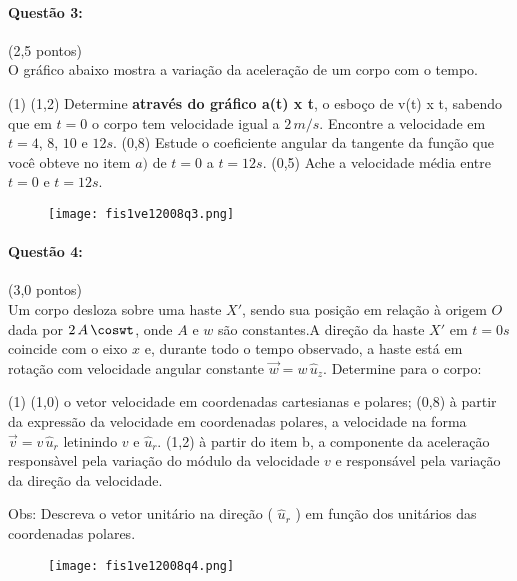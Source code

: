 \documentclass[12pt,a4paper]{article}
\begin{document}
\paragraph{Questão 3:}(2,5 pontos)\\
O gráfico abaixo mostra a variação da aceleração de um corpo com o tempo.

\begin {tasks}(1)
\task (1,2) Determine \textbf{através do gráfico a(t) x t}, o esboço de v(t) x t, sabendo que em $t=0$ o corpo tem velocidade igual a $2\,m/s$. Encontre a velocidade em $t=4$, $8$, $10$ e $12s$.
\task (0,8) Estude o coeficiente angular da tangente da função que você obteve no item $a)$ de $t=0$ a $t=12s$.
\task (0,5) Ache a velocidade média entre $t=0$ e $t=12s$.
\end {tasks}

\begin{figure}[ht]
\centering
\texttt{[image: fis1ve12008q3.png]}
\end{figure}

\newpage
\paragraph{Questão 4:}(3,0 pontos)\\
Um corpo desloza sobre uma haste $X'$, sendo sua posição em relação à origem $O$ dada por $2\,A\,\coswt$, onde $A$ e $w$ são constantes.A direção da haste $X'$ em $t=0s$ coincide com o eixo $x$ e, durante todo o tempo observado, a haste está em rotação com velocidade angular constante $\vec{w}=w\,\hat{u}_z$. Determine para o corpo: 

\begin{tasks}(1)
\task (1,0) o vetor velocidade em coordenadas cartesianas e polares;
\task (0,8) à partir da expressão da velocidade em coordenadas polares, a velocidade na forma $\vec{v}=v\,\hat{u}_r$ letinindo $v$ e $\hat{u}_r$.
\task (1,2) à partir do item b, a componente da aceleração responsàvel pela variação do módulo da velocidade $v$ e responsável pela variação da direção da velocidade.
\end{tasks}
Obs: Descreva o vetor unitário na direção ( $ \hat{u}_r$ ) em função dos unitários das coordenadas polares.

\newpage

\begin{figure}[ht]
\centering
\texttt{[image: fis1ve12008q4.png]}
\end{figure}
\end{document}

